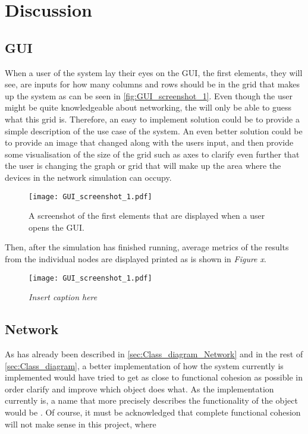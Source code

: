 \chapter{Discussion}\label{ch:Discussion}


\section{GUI}
When a user of the system lay their eyes on the GUI, the first elements, they will see, are inputs for how many columns and rows should be in the grid that makes up the system as can be seen in \autoref{fig:GUI_screenshot_1}. Even though the user might be quite knowledgeable about networking, the will only be able to guess what this grid is. Therefore, an easy to implement solution could be to provide a simple description of the use case of the system. An even better solution could be to provide an image that changed along with the users input, and then provide some visualisation of the size of the grid such as axes to clarify even further that the user is changing the graph or grid that will make up the area where the devices in the network simulation can occupy.

\begin{figure}[H]
  \centering
  \texttt{[image: GUI\_screenshot\_1.pdf]}
  \caption{A screenshot of the first elements that are displayed when a user opens the GUI.}
  \label{fig:GUI_screenshot_1}
\end{figure}

Then, after the simulation has finished running, average metrics of the results from the individual nodes are displayed printed as is shown in \textit{Figure x}.

\begin{figure}[H]
  \centering
  \texttt{[image: GUI\_screenshot\_1.pdf]}
  \caption{\textit{Insert caption here}}
  \label{fig:GUI_screenshot_2}
\end{figure}



\section{Network}
As has already been described in \autoref{sec:Class_diagram_Network} and in the rest of \autoref{sec:Class_diagram}, a better implementation of how the system currently is implemented would have tried to get as close to functional cohesion as possible in order clarify and improve which object does what. As the implementation currently is, a name that more precisely describes the functionality of the  object would be . Of course, it must be acknowledged that complete functional cohesion will not make sense in this project, where


